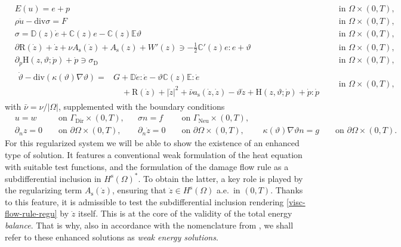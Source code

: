 \documentclass[a4paper,10pt,reqno]{amsart}
\numberwithin{equation}{section}
\numberwithin{equation}{section}
\newcommand{\teta}{\vartheta}
\newcommand{\sig}[1]{E(#1)}
\newcommand{\Dir}{\mathrm{Dir}}
\newcommand{\Neu}{\mathrm{Neu}}
\newcommand{\bbC}{\mathbb{C}}
\newcommand{\condu}{\kappa}
\newcommand{\dip}[3]{\mathrm{H}(#1,#2;#3)}
\newcommand{\did}[1]{\mathrm{R}(#1)}
\newcommand{\Gdir}{\Gamma_{\Dir}}
\newcommand{\Gneu}{\Gamma_{\Neu}}
\newcommand{\spz}{H^{\mathrm{s}}(\Omega)}
\newcommand{\As}{A_{\mathrm{s}}}
\newcommand{\ass}{a_{\mathrm{s}}}
\newcommand{\EEE}{\color{black}}
\newcommand{\MMM}{\color{black}}%
\begin{document}
  \begin{subequations}
 \label{regularized-system}
 \begin{align}
\label{decomp-intro-bis}
&
\sig u = e+p  &&  \text{ in } \Omega \times (0,T), 
\\
\label{mom-balance-intro-bis}
&
 \rho \ddot{u} - \mathrm{div}\sigma = F  && \text{ in } \Omega \times (0,T),
\\
\nonumber
  & \sigma = \mathbb{D}(z) \dot{e} + \mathbb{C}(z)e - \bbC(z)\mathbb{E}\teta  &&  \text{ in } \Omega \times (0,T), 
\\
 \label{visc-flow-rule-regu}
 &
 \partial\did{\dot{z}} + \dot{z} + \nu \As (\dot z) +  \As (z)+ W'(z) \ni - \tfrac12\bbC'(z)e : e +\teta &&     \text{ in } \Omega \times (0,T),
 \\
 &
  \label{pl-flow-rule-bis}
 \partial_{\dot{p}}  \dip{z}{\teta}{\dot{p}} + \dot{p} \ni \sigma_{\mathrm{D}}   && \text{ in } \Omega \times (0,T),
 \\
 \label{heat-regu}
&
\begin{aligned}
\dot{\teta} - \mathrm{div}(\condu(\teta)\nabla \teta)  = & G+
\mathbb{D} \dot{e} : 
\dot{e} -\teta \mathbb{C}(z)\mathbb{E}  : \dot{e}
\\ & 
\quad 
+ \did {\dot z} + |\dot z|^2 +\bar{\nu} \ass(\dot z, \dot z)  -\teta \dot z 
+ \dip{z}{\teta}{\dot{p}} + \dot{p}: \dot{p}
 \end{aligned}
 && \text{ in } \Omega \times (0,T),
\end{align}
\end{subequations}
with $\bar{\nu} = \nu/|\Omega|$, 
supplemented with the
boundary conditions  %
\begin{subequations}
\label{more-reg-bc}
\begin{align}
& 
u = w   && \text{ on } \Gdir \times (0,T),  && \sigma n = f &&  \text{ on } \Gneu \times (0,T),  && &&
\\
&
\partial_n z =0  &&  \text{ on } \partial\Omega \times (0,T), 
&&
\partial_n \dot{z} =0   && \text{ on } \partial\Omega \times (0,T),
 &&  \condu(\teta) \nabla \teta n = g  &&   \text{ on } \partial\Omega \times (0,T).
\end{align}
\end{subequations}
For this  regularized system we will  be able to show the existence of \MMM  an enhanced type of solution. 
It features \EEE a conventional weak formulation of the heat equation with suitable test functions, and the formulation of the damage flow rule as a subdifferential inclusion in $\spz^*$. To obtain the latter, a key role is played by the regularizing term 
$\As (\dot z) $, ensuring that $\dot z \in \spz$  a.e.\ in $(0,T)$.
Thanks to this feature, it is admissible to test the subdifferential inclusion rendering \eqref{visc-flow-rule-regu} by $\dot {z}$ itself. This is at the core of the validity of the total energy \emph{balance}.  \MMM That is why, also in accordance with the nomenclature from 
\cite{Rocca-Rossi, Rossi2016}, we shall refer to these enhanced solutions as \EEE
\emph{weak energy solutions}.
\end{document}
